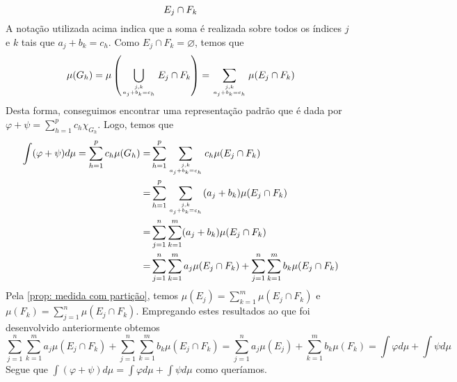 \begin{prova}
$${\begin{minipage}{1.4cm}
    \end{minipage}} E_j \cap F_k
    $$
    A notação utilizada acima indica que a soma é realizada sobre todos os índices $j$ e $k$ tais que $a_j + b_k =c_h$.
    Como $E_j \cap F_k = \varnothing$, temos que 
    $$
    \mu(G_h) = \mu\left(\bigcup_{
        j,k\atop
        a_j + b_k = c_h} E_j \cap F_k
    \right)
    = 
    \sum_{
        j,k\atop
        a_j + b_k = c_h} \mu(E_j \cap F_k)
    $$
    Desta forma, conseguimos encontrar uma representação padrão que é dada por 
    $\displaystyle \varphi + \psi = \sum_{h =1}^p c_h\chi_{G_h}$.
    Logo, temos que 
    \begin{align*}
        \int(\varphi + \psi) d\mu = \sum_{h =1}^p c_h\mu(G_h)
        = & 
        \sum_{h = 1}^p\sum_{ j,k\atop a_j + b_k = c_h}c_h \mu(E_j \cap F_k)\\
        = &
        \sum_{h = 1}^p\sum_{ j,k\atop a_j + b_k = c_h}(a_j + b_k) \mu(E_j \cap F_k)\\
        = &
        \sum_{j = 1}^n\sum_{k = 1}^m(a_j + b_k) \mu(E_j \cap F_k)\\
        = &
        \sum_{j = 1}^n\sum_{k = 1}^m a_j \mu(E_j \cap F_k) + \sum_{j = 1}^n\sum_{k = 1}^m b_k \mu(E_j \cap F_k)
    \end{align*}
	Pela \ref{prop: medida com partição}, temos
	$
	\displaystyle
	\mu(E_j) = \sum_{k = 1}^m \mu(E_j \cap F_k)
	$
    e
    $\displaystyle \mu(F_k) = \sum_{j = 1}^n \mu(E_j \cap F_k)$.
    Empregando estes resultados ao que foi desenvolvido anteriormente obtemos
    $$
    \sum_{j = 1}^n\sum_{k = 1}^m a_j \mu(E_j \cap F_k) + \sum_{j = 1}^n\sum_{k = 1}^m b_k \mu(E_j \cap F_k)
    =
    \sum_{j = 1}^n a_j \mu(E_j) + \sum_{k = 1}^m b_k \mu(F_k)
    =
    \int \varphi d\mu + \int \psi d\mu
    $$
    Segue que $\displaystyle\int(\varphi + \psi) d\mu = \int \varphi d\mu + \int \psi d\mu$ como queríamos.
\end{prova}



